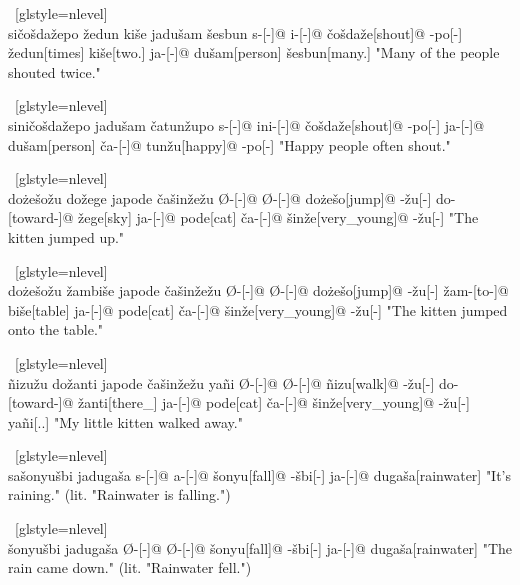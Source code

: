 \ex~[glstyle=nlevel]
\begingl 
\glpreamble {} \\ sičošdažepo žedun kiše jadušam šesbun
\endpreamble
s-[{\Ind}-]@
i-[{\Iter}-]@
čošdaže[shout]@
-po[-{\Hg}]
žedun[times]
kiše[two.{\Inan}]
ja-[{\Nom}-]@
dušam[person]
šesbun[many.{\Hg}]
\glft "Many of the people shouted twice."
\endgl
\xe

\ex~[glstyle=nlevel]
\begingl
\glpreamble {} \\ siničošdažepo jadušam čatunžupo
\endpreamble
s-[{\Ind}-]@
ini-[{\Hab}-]@
čošdaže[shout]@
-po[-{\Hg}]
ja-[{\Nom}-]@
dušam[person]
ča-[{\Nom}-]@
tunžu[happy]@
-po[-{\Hg}]
\glft "Happy people often shout."
\endgl
\xe

\ex~[glstyle=nlevel]
\begingl 
\glpreamble {} \\ dożešožu dožege japode čašinžežu
\endpreamble
Ø-[{\Ind}-]@
Ø-[{\Pfv}-]@
dożešo[jump]@
-žu[-{\An}]
do-[toward-]@
žege[sky]
ja-[{\Nom}-]@
pode[cat]
ča-[{\Nom}-]@
šinže[very\_young]@
-žu[-{\An}]
\glft "The kitten jumped up."
\endgl
\xe

\ex~[glstyle=nlevel]
\begingl 
\glpreamble {} \\ dożešožu žambiše japode čašinžežu
\endpreamble
Ø-[{\Ind}-]@
Ø-[{\Pfv}-]@
dożešo[jump]@
-žu[-{\An}]
žam-[to-]@
biše[table]
ja-[{\Nom}-]@
pode[cat]
ča-[{\Nom}-]@
šinže[very\_young]@
-žu[-{\An}]
\glft "The kitten jumped onto the table."
\endgl
\xe

\ex~[glstyle=nlevel]
\begingl 
\glpreamble {} \\ ñizužu dožanti japode čašinžežu yañi
\endpreamble
Ø-[{\Ind}-]@
Ø-[{\Pfv}-]@
ñizu[walk]@
-žu[-{\An}]
do-[toward-]@
žanti[there\_{\Dist}]
ja-[{\Nom}-]@
pode[cat]
ča-[{\Nom}-]@
šinže[very\_young]@
-žu[-{\An}]
yañi[{\Fex}.{\Hg}.{\Gen}]
\glft "My little kitten walked away."
\endgl
\xe

\ex~[glstyle=nlevel]
\begingl 
\glpreamble {} \\ sašonyušbi jadugaša
\endpreamble
s-[{\Ind}-]@
a-[{\Prog}-]@
šonyu[fall]@
-šbi[-{\Inan}]
ja-[{\Nom}-]@
dugaša[rainwater]
\glft "It's raining." (lit. "Rainwater is falling.")
\endgl
\xe

\ex~[glstyle=nlevel]
\begingl 
\glpreamble {} \\ šonyušbi jadugaša
\endpreamble
Ø-[{\Ind}-]@
Ø-[{\Pfv}-]@
šonyu[fall]@
-šbi[-{\Inan}]
ja-[{\Nom}-]@
dugaša[rainwater]
\glft "The rain came down." (lit. "Rainwater fell.")
\endgl
\xe

